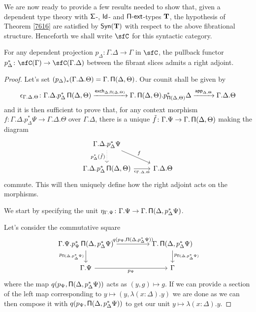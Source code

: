 We are now ready to provide a few results needed to show that, given a dependent
type theory with $\operatorname{\mathsf{\Sigma}}$-, $\operatorname{\mathsf{Id}}$- and $\operatorname{\mathsf{\Pi-ext}}$-types $\operatorname{\mathbf{T}}$, the hypothesis of
Theorem \ref{7616} are satisfied by $\mathsf{Syn}(\mathbf{T})$ with respect to the above
fibrational structure. Henceforth we shall write $\sfC$ for this syntactic
category.

\begin{lem}\label{radj}
  For any dependent projection $p_\Delta\colon\Gamma.\Delta\rightarrow\Gamma$ in
  $\sfC$, the pullback functor
  $p_\Delta^*\colon\sfC(\Gamma)\rightarrow\sfC(\Gamma.\Delta)$ between the
  fibrant slices admits a right adjoint.
\end{lem}
\begin{proof}
  Let's set $(p_\Delta)_*(\Gamma.\Delta.\Theta)=\Gamma.\operatorname{\mathsf{\Pi}}(\Delta,\Theta)$. Our
  counit shall be given by
  \[\epsilon_{\Gamma.\Delta.\Theta}\colon\Gamma.\Delta.p^*_\Delta\operatorname{\mathsf{\Pi}}(\Delta,\Theta)
  \xrightarrow{\operatorname{\mathsf{exch}}_{\Delta,\operatorname{\mathsf{\Pi}}(\Delta,\Theta)}}\Gamma.\operatorname{\mathsf{\Pi}}(\Delta,\Theta).p^*_{\operatorname{\mathsf{\Pi}}(\Delta,\Theta)}\Delta
  \xrightarrow{\operatorname{\mathsf{app}}_{\Delta,\Theta}}\Gamma.\Delta.\Theta\]
  and it is then sufficient to prove that, for any context morphism
  $f\colon\Gamma.\Delta.p^*_\Delta\Psi\rightarrow\Gamma.\Delta.\Theta$ over
  $\Gamma.\Delta$, there is
  a unique $\tilde{f}\colon\Gamma.\Psi\rightarrow\Gamma.\operatorname{\mathsf{\Pi}}(\Delta,\Theta)$
  making the diagram
  \[\begin{tikzcd}
    {\Gamma.\Delta.p^*_\Delta\Psi} \\
    {\Gamma.\Delta.p^*_\Delta\Pis(\Delta,\Theta)} & {\Gamma.\Delta.\Theta}
    \arrow["f", from=1-1, to=2-2]
    \arrow["{\epsilon_{\Gamma.\Delta.\Theta}}"', from=2-1, to=2-2]
    \arrow["{p^*_\Delta(\tilde{f})}"', dotted, from=1-1, to=2-1]
  \end{tikzcd}\]
  commute. This will then uniquely define how the right adjoint acts on the
  morphisms.

\noindent
  We start by specifying the unit
  $\eta_{\Gamma.\Psi}\colon\Gamma.\Psi\rightarrow\Gamma.\operatorname{\mathsf{\Pi}}(\Delta,p^*_{\Delta}\Psi)$.

\noindent
  Let's consider the commutative square
  \[\begin{tikzcd}[column sep=huge]
    {\Gamma.\Psi.p^*_\Psi\Pis(\Delta,p^*_\Delta\Psi)} & {\Gamma.\Pis(\Delta,p^*_\Delta\Psi)} \\
    {\Gamma.\Psi} & \Gamma
    \arrow["{p_{\Pis(\Delta,p^*_\Delta\Psi)}}"', from=1-1, to=2-1]
    \arrow["{p_{\Psi}}"', from=2-1, to=2-2]
    \arrow["{p_{\Pis(\Delta,p^*_\Delta\Psi)}}", from=1-2, to=2-2]
    \arrow["{q(p_\Psi,\Pis(\Delta,p^*_\Delta\Psi))}", from=1-1, to=1-2]
  \end{tikzcd}\]
  where the map $q(p_\Psi,\operatorname{\mathsf{\Pi}}(\Delta,p^*_\Delta\Psi))$ acts as $(y,g)\mapsto
  g$. If we can provide a section of the left map
  corresponding to $y\mapsto(y,\lambda(x:\Delta).y)$ we are
  done as we can then compose
  it with $q(p_\Psi,\operatorname{\mathsf{\Pi}}(\Delta,p^*_\Delta\Psi))$ to get our unit
  $y\mapsto\lambda(x:\Delta).y$.
  

\end{proof}
